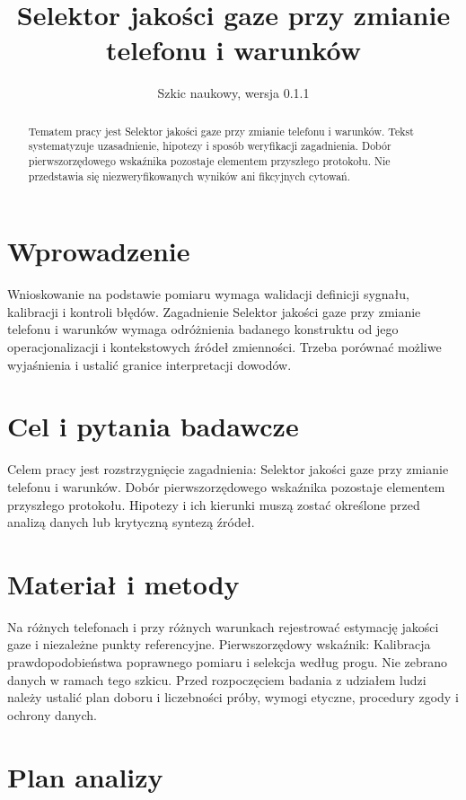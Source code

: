 \documentclass[11pt,a4paper]{article}
\title{Selektor jakości gaze przy zmianie telefonu i warunków}
\author{}
\date{Szkic naukowy, wersja 0.1.1}
\begin{document}
\maketitle

\begin{abstract}

Tematem pracy jest Selektor jakości gaze przy zmianie telefonu i warunków. Tekst systematyzuje uzasadnienie, hipotezy i sposób weryfikacji zagadnienia. Dobór pierwszorzędowego wskaźnika pozostaje elementem przyszłego protokołu. Nie przedstawia się niezweryfikowanych wyników ani fikcyjnych cytowań.

\end{abstract}

\section{Wprowadzenie}

Wnioskowanie na podstawie pomiaru wymaga walidacji definicji sygnału, kalibracji i kontroli błędów. Zagadnienie Selektor jakości gaze przy zmianie telefonu i warunków wymaga odróżnienia badanego konstruktu od jego operacjonalizacji i kontekstowych źródeł zmienności. Trzeba porównać możliwe wyjaśnienia i ustalić granice interpretacji dowodów.

\section{Cel i pytania badawcze}

Celem pracy jest rozstrzygnięcie zagadnienia: Selektor jakości gaze przy zmianie telefonu i warunków. Dobór pierwszorzędowego wskaźnika pozostaje elementem przyszłego protokołu. Hipotezy i ich kierunki muszą zostać określone przed analizą danych lub krytyczną syntezą źródeł.

\section{Materiał i metody}

Na różnych telefonach i przy różnych warunkach rejestrować estymację jakości gaze i niezależne punkty referencyjne. Pierwszorzędowy wskaźnik: Kalibracja prawdopodobieństwa poprawnego pomiaru i selekcja według progu. Nie zebrano danych w ramach tego szkicu. Przed rozpoczęciem badania z udziałem ludzi należy ustalić plan doboru i liczebności próby, wymogi etyczne, procedury zgody i ochrony danych.

\section{Plan analizy}
\end{document}
